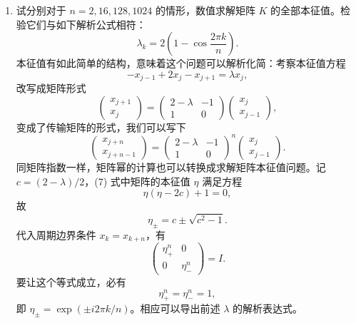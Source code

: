 \begin{enumerate}
\item 试分别对于 $n=2,16,128,1024$ 的情形，数值求解矩阵 $K$ 的全部本征值。检验它们与如下解析公式相符：
\begin{equation}
\lambda_k=2\left(1-\cos\frac{2\pi k}{n}\right).
\tag{5}
\end{equation}
本征值有如此简单的结构，意味着这个问题可以解析化简：考察本征值方程
\begin{equation}
-x_{j-1}+2x_j-x_{j+1}=\lambda x_j,
\tag{6}
\end{equation}
改写成矩阵形式
\begin{equation}
\begin{pmatrix}x_{j+1}\\x_j\end{pmatrix}
=
\begin{pmatrix}2-\lambda&-1\\1&0\end{pmatrix}
\begin{pmatrix}x_j\\x_{j-1}\end{pmatrix},
\tag{7}
\end{equation}
变成了传输矩阵的形式，我们可以写下
\begin{equation}
\begin{pmatrix}x_{j+n}\\x_{j+n-1}\end{pmatrix}
=
\begin{pmatrix}2-\lambda&-1\\1&0\end{pmatrix}^{n}
\begin{pmatrix}x_j\\x_{j-1}\end{pmatrix}.
\tag{8}
\end{equation}
同矩阵指数一样，矩阵幂的计算也可以转换成求解矩阵本征值问题。记 $c=(2-\lambda)/2$，(7) 式中矩阵的本征值 $\eta$ 满足方程
\begin{equation}
\eta(\eta-2c)+1=0,
\tag{9}
\end{equation}
故
\begin{equation}
\eta_{\pm}=c\pm\sqrt{c^2-1}.
\tag{10}
\end{equation}
代入周期边界条件 $x_k=x_{k+n}$，有
\begin{equation}
\begin{pmatrix}\eta_+^n&0\\0&\eta_-^n\end{pmatrix}=I.
\tag{11}
\end{equation}
要让这个等式成立，必有
\begin{equation}
\eta_+^n=\eta_-^n=1,
\tag{12}
\end{equation}
即 $\eta_{\pm}=\exp(\pm i2\pi k/n)$。相应可以导出前述 $\lambda$ 的解析表达式。


\end{enumerate}
